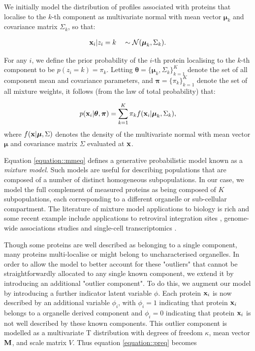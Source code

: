\documentclass[12pt,english]{article}\usepackage[]{graphicx}\usepackage[]{color}
\begin{document}
We initially model the distribution of profiles associated with proteins that localise to the $k$-th component as multivariate normal with mean vector $\boldsymbol{\mu}_k$ and covariance matrix $\Sigma_k$, so that:

\begin{align}
{\bf x}_i | z_i = k \quad \sim \mathcal{N}(\boldsymbol{\mu}_k, \Sigma_k). \label{equation::preq}
\end{align}

For any $i$, we define the prior probability of the $i$-th protein localising to the $k$-th component to be $p(z_i = k) = \pi_k$.  Letting $\boldsymbol{\theta} = \{\boldsymbol{\mu}_k, \Sigma_k \}_{k = 1}^K$ denote the set of all component mean and covariance parameters, and $\boldsymbol{\pi} = \{\pi_k\}_{k = 1}^K$ denote the set of all mixture weights, it follows (from the law of total probability) that:

\begin{align}
p({\bf x}_i | \boldsymbol{\theta}, \boldsymbol{\pi} ) = \sum_{k = 1}^K \pi_k f({\bf x}_i|\boldsymbol{\mu}_k, \Sigma_k),\label{equation::mmeq}
\end{align}
where $f({\bf x} | \boldsymbol{\mu}, \Sigma)$ denotes the density of the multivariate normal with mean vector $\boldsymbol{\mu}$ and covariance matrix $\Sigma$ evaluated at ${\bf x}$.

Equation \eqref{equation::mmeq} defines a generative probabilistic model known as a {\em mixture model}.  Such models are useful for describing populations that are composed of a number of distinct homogeneous subpopulations.  In our case, we model the full complement of measured proteins as being composed of $K$ subpopulations, each corresponding to a different organelle or sub-cellular compartment. The literature
of mixture model applications to biology is rich and some recent example
include applications to retroviral integration sites \citep{Kirk:2016}, genome-wide associations studies
\citep{Liley:2017} and single-cell transcriptomics \citep{Lonnberg:2017}.

Though some proteins are well described as belonging to a single component, many proteins multi-localise or might belong to uncharacterised organelles. In order to allow the model to better account for these "outliers" that cannot be straightforwardly allocated to any single known component, we extend it by introducing an additional "outlier component". To do this, we augment our model by introducing a further indicator latent variable $\phi$. Each protein ${\bf x}_i$ is now described by an additional variable $\phi_i$, with $\phi_i = 1$ indicating that protein ${\bf x}_i$ belongs to a organelle derived component and $\phi_i = 0$ indicating that protein ${\bf x}_i$ is not well described by these known components. This outlier component is modelled as a multivariate T distribution with degrees of freedom $\kappa$, mean vector $\bf{M}$, and scale matrix $V$. Thus equation \eqref{equation::preq} becomes
\end{document}
